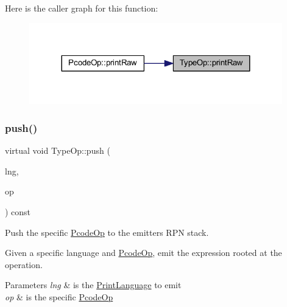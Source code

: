 Here is the caller graph for this function\+:
\nopagebreak
\begin{figure}[H]
\begin{center}
\leavevmode
\includegraphics[width=311pt]{class_type_op_a60717e486917a30cc7cb6e3ce02585e1_icgraph}
\end{center}
\end{figure}
\mbox{\label{class_type_op_ac9c9544203ed74dabe6ac662b653b2af}} 
\subsubsection{\texorpdfstring{push()}{push()}}
{\footnotesize\ttfamily virtual void Type\+Op\+::push (\begin{DoxyParamCaption}\item[{\mbox{\hyperlink{class_print_language}{Print\+Language}} $\ast$}]{lng,  }\item[{const \mbox{\hyperlink{class_pcode_op}{Pcode\+Op}} $\ast$}]{op }\end{DoxyParamCaption}) const\hspace{0.3cm}{\ttfamily [pure virtual]}}



Push the specific \mbox{\hyperlink{class_pcode_op}{Pcode\+Op}} to the emitter\textquotesingle{}s R\+PN stack. 

Given a specific language and \mbox{\hyperlink{class_pcode_op}{Pcode\+Op}}, emit the expression rooted at the operation. 
\begin{DoxyParams}{Parameters}
{\em lng} & is the \mbox{\hyperlink{class_print_language}{Print\+Language}} to emit \\
\hline
{\em op} & is the specific \mbox{\hyperlink{class_pcode_op}{Pcode\+Op}} \\
\hline
\end{DoxyParams}


